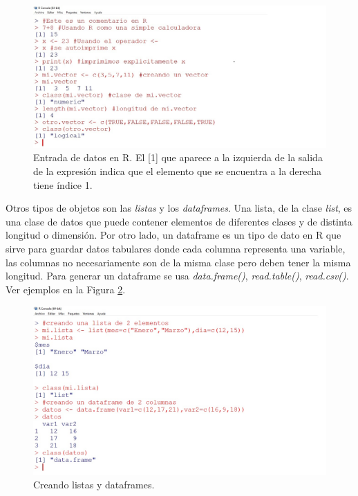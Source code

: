 \begin{figure}[H]
  \centering
    \includegraphics[scale=0.46]{Capitulo3/figs/consola1.jpg}      %
  \caption[Entrada de datos en R]{Entrada de datos en R. El [1] que aparece a la izquierda de la salida de la expresión indica que el elemento que se encuentra a la derecha tiene índice 1.}            %
  \label{consola1}                            %
\end{figure}


Otros tipos de objetos son las \emph{listas} y los \emph{dataframes}. Una lista, de la clase \emph{list}, es una clase de datos que puede contener elementos de diferentes clases y de distinta longitud o dimensión. Por otro lado, un dataframe es un tipo de dato en R que sirve para guardar datos tabulares donde cada columna representa una variable, las columnas no necesariamente son de la misma clase pero deben tener la misma longitud. Para generar un dataframe se usa \emph{data.frame()}, \emph{read.table()}, \emph{read.csv()}. Ver ejemplos en la Figura \ref{consola2}.\\

\begin{figure}[H]
  \centering
    \includegraphics[scale=0.46]{Capitulo3/figs/consola2.jpg}      %
  \caption{Creando listas y dataframes.}            %
  \label{consola2}                            %
\end{figure}

